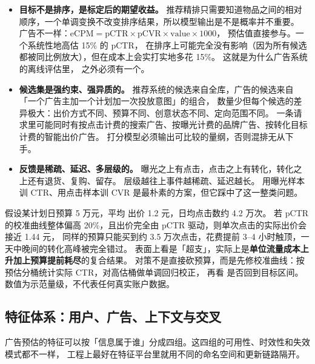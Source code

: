 \begin{itemize}
  \item \textbf{目标不是排序，是标定后的期望收益。}
        推荐精排只需要知道物品之间的相对顺序，一个单调变换不改变排序结果，所以模型输出是不是概率并不重要。
        广告不一样：$\mathrm{eCPM} = \mathrm{pCTR} \times \mathrm{pCVR} \times \text{value} \times 1000$，
        预估值直接参与。一个系统性地高估 15\% 的 pCTR，
        在排序上可能完全没有影响（因为所有候选都被同比例放大），但在成本上会实打实地多花 15\%。
        这就是为什么广告系统的离线评估里， 之外必须有一个。
  \item \textbf{候选集是强约束、强异质的。}
        推荐系统的候选来自全库，广告的候选来自「一个广告主加一个计划加一次投放意图」的组合，
        数量少但每个候选的差异极大：出价方式不同、预算不同、创意状态不同、定向范围不同。
        一条请求里可能同时有按点击计费的搜索广告、按曝光计费的品牌广告、按转化目标计费的智能出价广告。
        打分模型必须输出可比较的量纲，否则混排无从下手。
  \item \textbf{反馈是稀疏、延迟、多层级的。}
        曝光之上有点击，点击之上有转化，转化之上还有退货、复购、留存。
        层级越往上事件越稀疏、延迟越长。
        用曝光样本训 CTR、用点击样本训 CVR 是最朴素的方案，但它踩中了这一整类问题。
\end{itemize}

\begin{casebox}
假设某计划日预算 5 万元，平均  出价 1.2 元，日均点击数约 4.2 万次。
若 pCTR 的校准曲线整体偏高 20\%，且出价完全由 pCTR 驱动，则单次点击的实际出价会接近 1.44 元，
同样的预算只能买到约 3.5 万次点击，花费提前 3--4 小时触顶，一天中晚间的转化高峰被完全错过。
表面上看是「超支」，实际上是\textbf{单位流量成本上升加上预算提前耗尽}的复合结果。
对策不是直接砍预算，而是先修校准曲线：按预估分桶统计实际 CTR，对高估桶做单调回归校正，
再看  是否回到目标区间。数值为示范量级，不代表任何真实账户数据。
\end{casebox}

\subsection{特征体系：用户、广告、上下文与交叉}

广告预估的特征可以按「信息属于谁」分成四组。这四组的可用性、时效性和失效模式都不一样，
工程上最好在特征平台里就用不同的命名空间和更新链路隔开。

